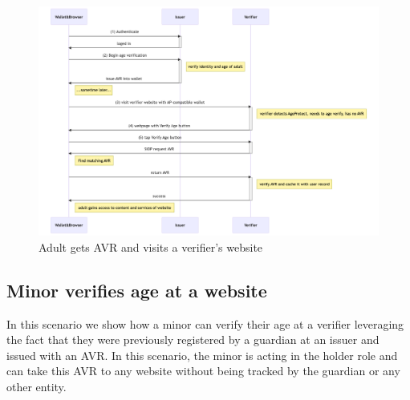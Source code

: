 \documentclass[11pt, oneside]{article}   	%
\begin{document}
\begin{figure}
	\includegraphics[width=\textwidth]{./images/adult-sequence.png}
	\caption{Adult gets AVR and visits a verifier's website}
	\label{fig:adult-seq}
\end{figure}

\subsection{Minor verifies age at a website}

In this scenario we show how a minor can verify their age at a verifier leveraging the fact that they were previously registered by a guardian at an issuer and issued with an AVR. In this scenario, the minor is acting in the holder role and can take this AVR to any website without being tracked by the guardian or any other entity. 
\end{document}
